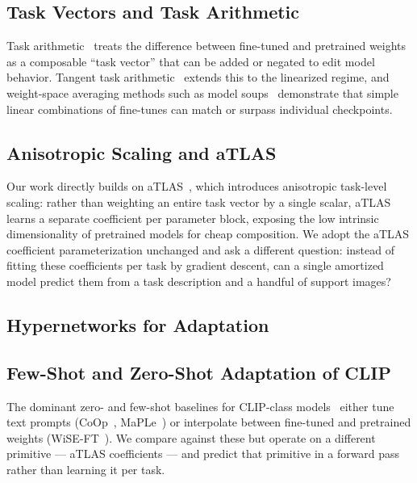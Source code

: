 \documentclass{article}
\begin{document}
\subsection{Task Vectors and Task Arithmetic}
Task arithmetic~\cite{ilharcoEditingModelsTask2022} treats the difference
between fine-tuned and pretrained weights as a composable ``task vector''
that can be added or negated to edit model behavior. Tangent task
arithmetic~\cite{ortiz-jimenezTaskArithmeticTangent2023} extends this to the
linearized regime, and weight-space averaging methods such as model
soups~\cite{wortsmanModelSoupsAveraging2022} demonstrate that simple linear
combinations of fine-tunes can match or surpass individual checkpoints.

\subsection{Anisotropic Scaling and aTLAS}
Our work directly builds on aTLAS~\cite{zhangKnowledgeCompositionUsing2024},
which introduces anisotropic task-level scaling: rather than weighting an
entire task vector by a single scalar, aTLAS learns a separate coefficient
per parameter block, exposing the low intrinsic dimensionality of pretrained
models for cheap composition. We adopt the aTLAS coefficient parameterization
unchanged and ask a different question: instead of fitting these coefficients
per task by gradient descent, can a single amortized model predict them from
a task description and a handful of support images?

\subsection{Hypernetworks for Adaptation}

\subsection{Few-Shot and Zero-Shot Adaptation of CLIP}
The dominant zero- and few-shot baselines for CLIP-class
models~\cite{radfordLearningTransferableVisual2021} either tune text prompts
(CoOp~\cite{zhouLearningPromptVisionLanguage2022},
MaPLe~\cite{khattakMaPLeMultimodalPrompt2023}) or interpolate between
fine-tuned and pretrained weights
(WiSE-FT~\cite{wortsmanRobustFinetuningZeroshot2022}). We compare against
these but operate on a different primitive --- aTLAS coefficients --- and
predict that primitive in a forward pass rather than learning it per task.
\end{document}
